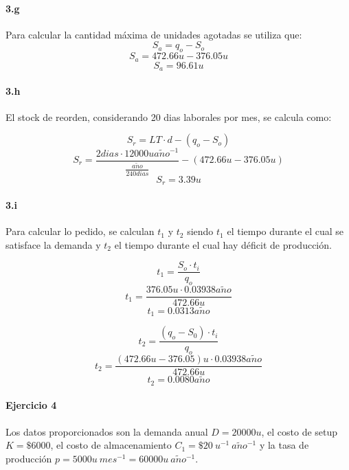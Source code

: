 \documentclass{article}
\def \anio {a\tilde{n}o}
\begin{document}
  \paragraph{3.g}
  Para calcular la cantidad m\'axima de unidades agotadas se utiliza que:
  $$S_a = q_o - S_o $$
  $$S_a = 472.66 u - 376.05 u $$
  $$\boxed{S_a = 96.61 u } $$

 \paragraph{3.h}
 El stock de reorden, considerando 20 dias laborales por mes, se calcula como:
  
 $$S_r = LT \cdot d - (q_o - S_o) $$
 $$S_r =  \frac{2dias \cdot 12000 u \anio^{-1}}{\frac{\anio}{240 dias}} - ( 472.66 u - 376.05 u) $$
 $$\boxed{S_r = 3.39 u} $$

  \paragraph{3.i}
  Para calcular lo pedido, se calculan $t_1$ y $t_2$ siendo $t_1$ el tiempo durante el cual se satisface la demanda y $t_2$ el tiempo durante el cual hay d\'eficit de producci\'on.

  $$t_1 = \frac{S_o \cdot t_i}{q_o} $$
  $$t_1 = \frac{376.05 u \cdot 0.03938 \anio}{472.66 u} $$
  $$\boxed{t_1 = 0.0313 \anio}$$

  $$t_2 = \frac{(q_o - S_0) \cdot t_i}{q_o} $$
  $$t_2 = \frac{(472.66 u - 376.05) u \cdot 0.03938 \anio}{472.66 u} $$
  $$\boxed{t_2 = 0.0080 \anio} $$
  
 
\paragraph{Ejercicio 4}
    Los datos proporcionados son la demanda anual $ D = 20000 u $, el costo de setup $ K = \$6000 $, el costo de almacenamiento $ C_1 = \$20\ u^{-1}\ \anio^{-1} $ y la tasa de producción $ p = 5000u\ mes^{-1} = 60000u\ \anio^{-1}$.
\end{document}
